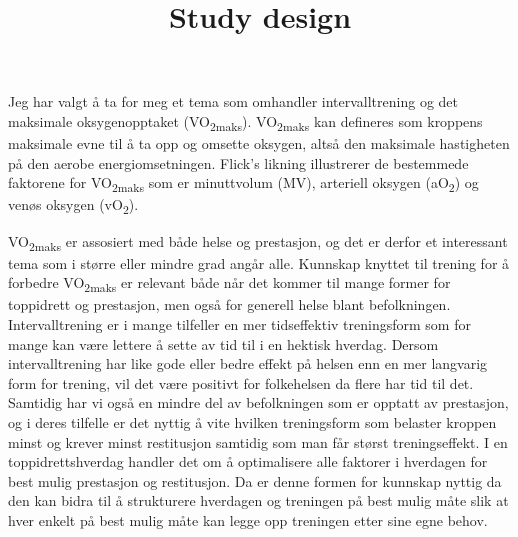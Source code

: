 \documentclass[
  letterpaper,
  DIV=11,
  numbers=noendperiod]{scrartcl}
\title{Study design}
\author{}
\date{}
\begin{document}
\maketitle
\ifdefined\Shaded\renewenvironment{Shaded}{\begin{tcolorbox}[sharp corners, enhanced, interior hidden, borderline west={3pt}{0pt}{shadecolor}, breakable, frame hidden, boxrule=0pt]}{\end{tcolorbox}}\fi

Jeg har valgt å ta for meg et tema som omhandler intervalltrening og det
maksimale oksygenopptaket (VO\textsubscript{2maks}).
VO\textsubscript{2maks} kan defineres som kroppens maksimale evne til å
ta opp og omsette oksygen, altså den maksimale hastigheten på den aerobe
energiomsetningen. Flick's likning illustrerer de bestemmede faktorene
for VO\textsubscript{2maks} som er minuttvolum (MV), arteriell oksygen
(aO\textsubscript{2}) og venøs oksygen (vO\textsubscript{2}).

VO\textsubscript{2maks} er assosiert med både helse og prestasjon, og
det er derfor et interessant tema som i større eller mindre grad angår
alle. Kunnskap knyttet til trening for å forbedre
VO\textsubscript{2maks} er relevant både når det kommer til mange former
for toppidrett og prestasjon, men også for generell helse blant
befolkningen. Intervalltrening er i mange tilfeller en mer tidseffektiv
treningsform som for mange kan være lettere å sette av tid til i en
hektisk hverdag. Dersom intervalltrening har like gode eller bedre
effekt på helsen enn en mer langvarig form for trening, vil det være
positivt for folkehelsen da flere har tid til det. Samtidig har vi også
en mindre del av befolkningen som er opptatt av prestasjon, og i deres
tilfelle er det nyttig å vite hvilken treningsform som belaster kroppen
minst og krever minst restitusjon samtidig som man får størst
treningseffekt. I en toppidrettshverdag handler det om å optimalisere
alle faktorer i hverdagen for best mulig prestasjon og restitusjon. Da
er denne formen for kunnskap nyttig da den kan bidra til å strukturere
hverdagen og treningen på best mulig måte slik at hver enkelt på best
mulig måte kan legge opp treningen etter sine egne behov.
\end{document}
